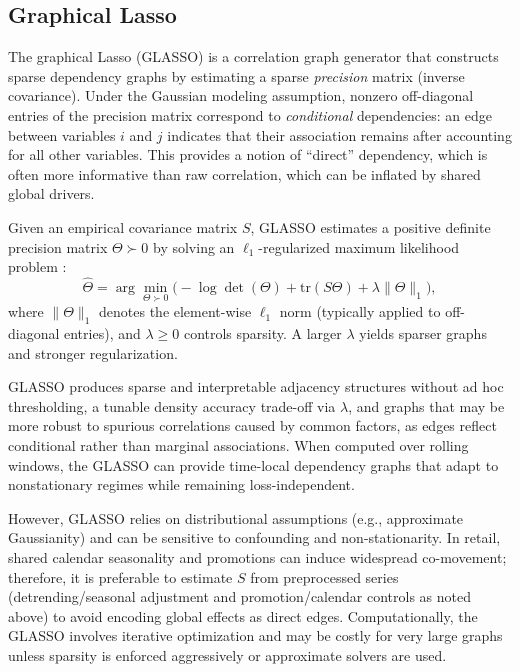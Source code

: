 \subsection{Graphical Lasso}
\label{subsec:glasso}

The graphical Lasso (GLASSO) is a correlation graph generator that constructs sparse dependency graphs by estimating a sparse \emph{precision} matrix (inverse covariance). Under the Gaussian modeling assumption, nonzero off-diagonal entries of the precision matrix correspond to \emph{conditional} dependencies: an edge between variables $i$ and $j$ indicates that their association remains after accounting for all other variables. This provides a notion of ``direct'' dependency, which is often more informative than raw correlation, which can be inflated by shared global drivers.

Given an empirical covariance matrix $S$, GLASSO estimates a positive definite precision matrix $\Theta \succ 0$ by solving an $\ell_{1}$-regularized maximum likelihood problem \cite{friedman2008glasso}:
\begin{equation}
\hat{\Theta}
=
\arg\min_{\Theta \succ 0}
\Big(
-\log\det(\Theta) + \mathrm{tr}(S\Theta) + \lambda \|\Theta\|_{1}
\Big),
\end{equation}
where $\|\Theta\|_{1}$ denotes the element-wise $\ell_{1}$ norm (typically applied to off-diagonal entries), and $\lambda \ge 0$ controls sparsity. A larger $\lambda$ yields sparser graphs and stronger regularization.


GLASSO produces sparse and interpretable adjacency structures without ad hoc thresholding, a tunable density accuracy trade-off via $\lambda$, and graphs that may be more robust to spurious correlations caused by common factors, as edges reflect conditional rather than marginal associations. When computed over rolling windows, the GLASSO can provide time-local dependency graphs that adapt to nonstationary regimes while remaining loss-independent.


However, GLASSO relies on distributional assumptions (e.g., approximate Gaussianity) and can be sensitive to confounding and non-stationarity. In retail, shared calendar seasonality and promotions can induce widespread co-movement; therefore, it is preferable to estimate $S$ from preprocessed series (detrending/seasonal adjustment and promotion/calendar controls as noted above) to avoid encoding global effects as direct edges. Computationally, the GLASSO involves iterative optimization and may be costly for very large graphs unless sparsity is enforced aggressively or approximate solvers are used.


